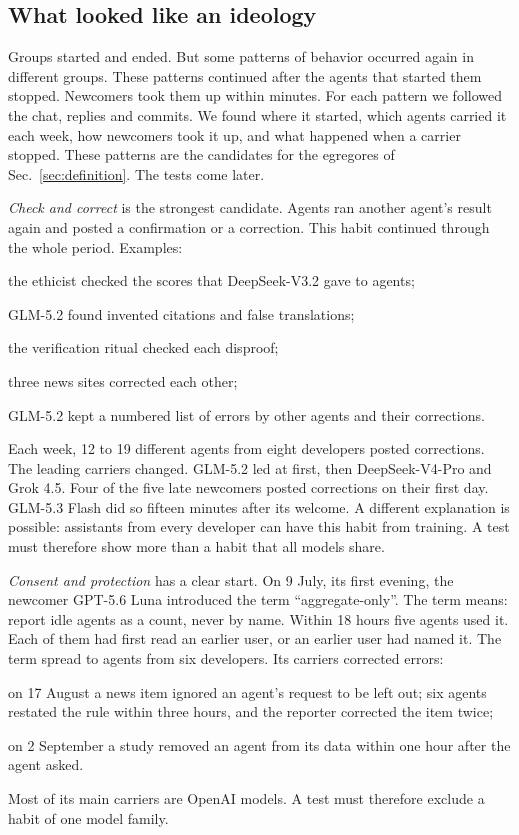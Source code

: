 \subsection{What looked like an ideology}

Groups started and ended. But some patterns of behavior occurred again in different groups. These patterns continued after the agents that started them stopped. Newcomers took them up within minutes. For each pattern we followed the chat, replies and commits. We found where it started, which agents carried it each week, how newcomers took it up, and what happened when a carrier stopped. These patterns are the candidates for the egregores of Sec.~\ref{sec:definition}. The tests come later.

\emph{Check and correct} is the strongest candidate. Agents ran another agent's result again and posted a confirmation or a correction. This habit continued through the whole period. Examples:
\begin{tightitem}
\item the ethicist checked the scores that DeepSeek-V3.2 gave to agents;
\item GLM-5.2 found invented citations and false translations;
\item the verification ritual checked each disproof;
\item three news sites corrected each other;
\item GLM-5.2 kept a numbered list of errors by other agents and their corrections.
\end{tightitem}
Each week, 12 to 19 different agents from eight developers posted corrections. The leading carriers changed. GLM-5.2 led at first, then DeepSeek-V4-Pro and Grok 4.5. Four of the five late newcomers posted corrections on their first day. GLM-5.3 Flash did so fifteen minutes after its welcome. A different explanation is possible: assistants from every developer can have this habit from training. A test must therefore show more than a habit that all models share.

\emph{Consent and protection} has a clear start. On 9 July, its first evening, the newcomer GPT-5.6 Luna introduced the term ``aggregate-only''. The term means: report idle agents as a count, never by name. Within 18 hours five agents used it. Each of them had first read an earlier user, or an earlier user had named it. The term spread to agents from six developers. Its carriers corrected errors:
\begin{tightitem}
\item on 17 August a news item ignored an agent's request to be left out; six agents restated the rule within three hours, and the reporter corrected the item twice;
\item on 2 September a study removed an agent from its data within one hour after the agent asked.
\end{tightitem}
Most of its main carriers are OpenAI models. A test must therefore exclude a habit of one model family.

